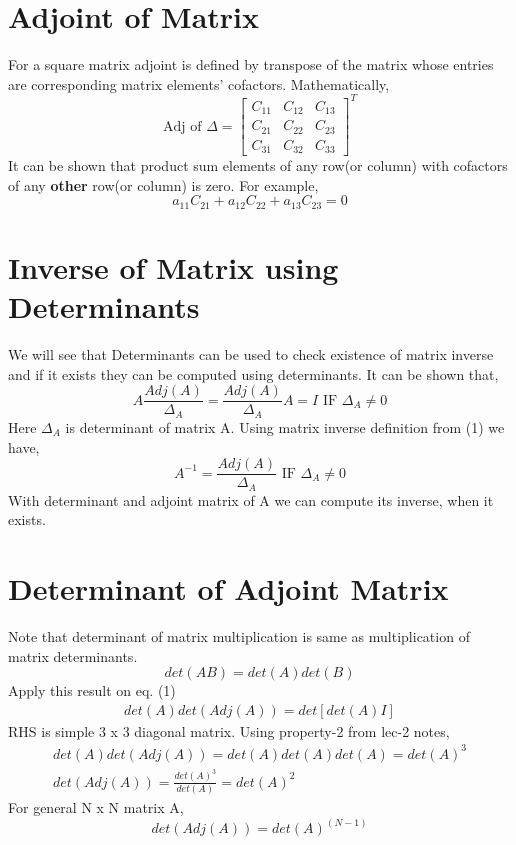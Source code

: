 \documentclass{article}
\begin{document}
\section{Adjoint of Matrix}
For a square matrix adjoint is defined by transpose of the matrix whose entries are corresponding matrix elements' cofactors. Mathematically,
\begin{equation*}
    \text{Adj of } \Delta =
    \begin{bmatrix}
        C_{11} & C_{12} & C_{13} \\
        C_{21} & C_{22} & C_{23} \\
        C_{31} & C_{32} & C_{33} 
    \end{bmatrix}^{T}
\end{equation*}
It can be shown that product sum elements of any row(or column) with cofactors of any \textbf{other} row(or column) is zero. For example,
\begin{equation*}
    a_{11}C_{21}+a_{12}C_{22}+a_{13}C_{23}=0
\end{equation*} 
\section{Inverse of Matrix using Determinants}
We will see that Determinants can be used to check existence of matrix inverse and if it exists they can be computed using determinants. It can be shown that,
\begin{equation}
    A\frac{Adj(A)}{\Delta_A}=\frac{Adj(A)}{\Delta_A} A =I \text{ IF  } \Delta_A \neq 0 
\end{equation}
Here $\Delta_A$ is determinant of matrix A. Using matrix inverse definition from (1) we have,
\begin{equation*}
    A^{-1}=\frac{Adj(A)}{\Delta_A} \text{       IF  } \Delta_A \neq 0 
\end{equation*}
With determinant and adjoint matrix of A we can compute its inverse, when it exists.
\section{Determinant of Adjoint Matrix}
Note that determinant of matrix multiplication is same as multiplication of matrix determinants. 
\begin{equation*}
    det(AB)=det(A)det(B)
\end{equation*}
Apply this result on eq. (1)
\begin{align*}
    det(A)det(Adj(A))=det[det(A)I]
\end{align*}
RHS is simple 3 x 3 diagonal matrix. Using property-2 from lec-2 notes,
\begin{align*}
    det(A)det(Adj(A))=det(A)det(A)det(A)=det(A)^3\\
    det(Adj(A))=\frac{det(A)^3}{det(A)}=det(A)^2
\end{align*}
For general N x N matrix A,
\begin{equation*}
    det(Adj(A))=det(A)^{(N-1)}
\end{equation*}
\end{document}
